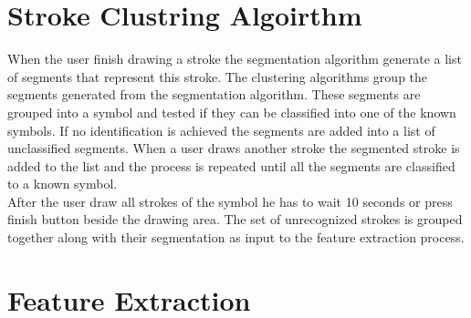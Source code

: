 \section{Stroke Clustring Algoirthm }
\label{sec:ClustringAlgoirthm}

When the user finish drawing a stroke the segmentation algorithm generate a list of segments that represent this stroke. The clustering algorithms group the segments generated from the segmentation algorithm. These segments are grouped into a symbol and tested if they can be classified into one of the known symbols. If no identification is achieved the segments are added into a list of unclassified segments. When a user draws another stroke the segmented stroke is added to the list and the process is repeated until all the segments are classified to a known symbol.\\

After the user draw all strokes of the symbol he has to wait 10 seconds or press finish button beside the drawing area. The set of unrecognized strokes is grouped together along with their segmentation as input to the feature extraction process. 

\section{ Feature Extraction}%
\label{sec:FeatureExtraction}

